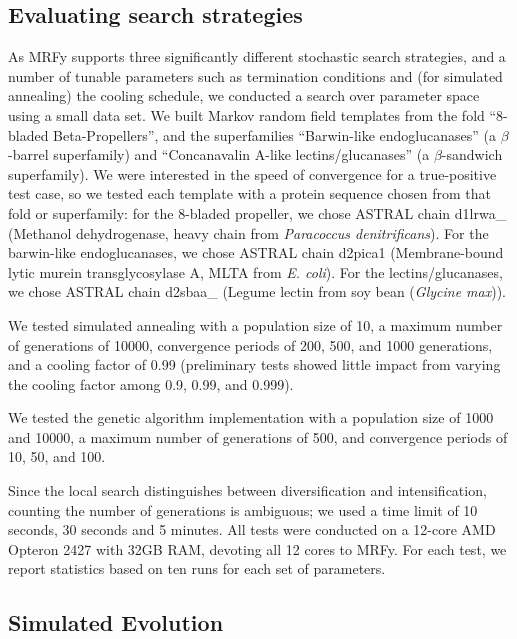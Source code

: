 \documentclass[blockstyle,times,preprint]{sigplanconf}
\begin{document}

\subsection{Evaluating search strategies}\label{searchstrats}

As MRFy supports three significantly different stochastic search strategies, and
a number of tunable parameters such as termination conditions and (for 
simulated annealing) the cooling schedule, we conducted a search over parameter
space using a small data set.
We built Markov random field templates from the fold ``8-bladed Beta-Propellers'', and the superfamilies ``Barwin-like endoglucanases'' (a 
$\beta$-barrel superfamily) and ``Concanavalin A-like lectins/glucanases'' (a 
$\beta$-sandwich superfamily).
We were interested in the speed of convergence for a true-positive test case,
so we tested each template with a protein sequence chosen from that fold or
superfamily: for the 8-bladed propeller, we chose ASTRAL chain d1lrwa\_
(Methanol dehydrogenase, heavy chain from  \emph{Paracoccus denitrificans}).
For the barwin-like endoglucanases, we chose ASTRAL chain d2pica1 
(Membrane-bound lytic murein transglycosylase A, MLTA from \emph{E. coli}).
For the lectins/glucanases, we chose ASTRAL chain d2sbaa\_ 
(Legume lectin from soy bean (\emph{Glycine max})).

We tested simulated annealing with a population size of 10, a maximum number of
generations of 10000, convergence periods of 200, 500, and 1000 generations, 
and a cooling factor of 0.99 (preliminary tests showed little impact from
varying the cooling factor among 0.9, 0.99, and 0.999).

We tested the genetic algorithm implementation with a population size of 1000 
and 10000, a maximum number of generations of 500, and convergence
periods of 10, 50, and 100.

Since the local search distinguishes between diversification and 
intensification, counting the number of generations is ambiguous; we used a time
limit of 10 seconds, 30 seconds and 5 minutes.
All tests were conducted on a 12-core AMD Opteron 2427 with 32GB RAM, devoting 
all 12 cores to MRFy.
For each test, we report statistics based on ten runs for each set of 
parameters.

\subsection{Simulated Evolution} \label{mrfy-simev}
\end{document}
